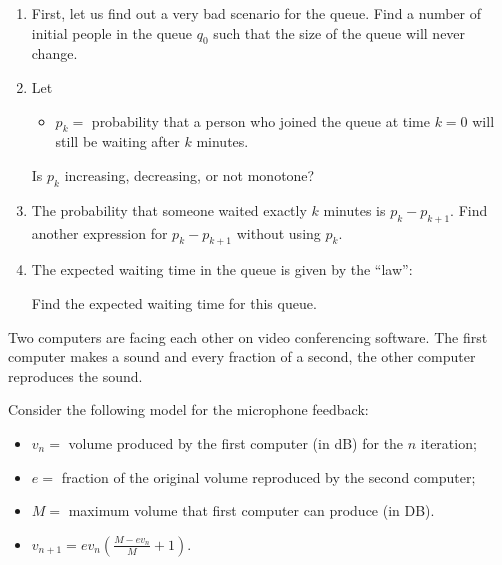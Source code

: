 \begin{exercises}
\begin{problist}
	\begin{enumerate}
		\item First, let us find out a very bad scenario for the queue. Find a number of initial people in the queue $q_0$ such that the size of the queue will never change.
		\item Let 
			\begin{itemize}
				\item $p_k=$ probability that a person who joined the queue at time $k=0$ will still be waiting after $k$ minutes.
			\end{itemize}
			Is $p_k$ increasing, decreasing, or not monotone?
		\item The probability that someone waited exactly $k$ minutes is $p_{k}-p_{k+1}$.
			Find another expression for $p_{k}-p_{k+1}$ without using $p_k$.
		\item The expected waiting time in the queue is given by the ``law'':
			
			\hspace{-.05\textwidth}
			
		Find the expected waiting time for this queue.
	\end{enumerate}
	
	
	
	
	
	\prob 	Two computers are facing each other on video conferencing software. The first computer makes a sound and every fraction of a second, the other computer reproduces the sound.
	
	Consider the following model for the microphone feedback:
	\begin{itemize}
		\item $v_n =$ volume produced by the first computer (in dB) for the $n$ iteration;
		\item $e=$ fraction of the original volume reproduced by the second computer;
		\item $M=$ maximum volume that first computer can produce (in DB). \\

		\item $v_{n+1} = e v_n \left( \frac{M - e v_n}{M}+1\right)$.
	\end{itemize}
	

\end{problist}
\end{exercises}
